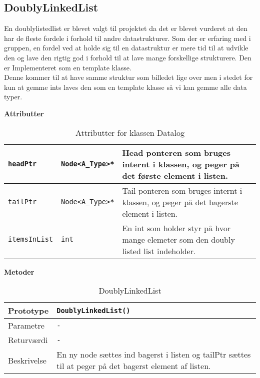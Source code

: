 \subsection{DoublyLinkedList}

En doublylistedlist er blevet valgt til projektet da det er blevet vurderet at den har de fleste fordele i forhold til andre datastrukturer. Som der er erfaring med i gruppen, en fordel ved at holde sig til en datastruktur er mere tid til at udvikle den og lave den rigtig god i forhold til at lave mange forskellige strukturere. Den er Implementeret som en template klasse.\\


Denne kommer til at have samme struktur som billedet lige over men i stedet for kun at gemme ints laves den som en template klasse så vi kan gemme alle data typer.

\textbf{Attributter}

\begin{table}[h]
\begin{tabularx}{\textwidth}{| >{\raggedright\arraybackslash}X | >{\raggedright\arraybackslash}X | >{\raggedright\arraybackslash}p{10 cm} |} \hline
\texttt{headPtr} & \texttt{Node<A\_Type>*} & Head ponteren som bruges internt i klassen, og peger på det første element i listen. \\\hline
\texttt{tailPtr} & \texttt{Node<A\_Type>*} & Tail ponteren som bruges internt i klassen, og peger på det bagerste element i listen. \\\hline
\texttt{itemsInList} & \texttt{int} & En int som holder styr på hvor mange elemeter som den doubly listed list indeholder. \\\hline
\end{tabularx}
\caption{Attributter for klassen Datalog}
\label{table:Datalog_attributter}
\end{table}

\textbf{Metoder}

\begin{table}[h]
\begin{tabularx}{\textwidth}{| >{\raggedright\arraybackslash}p{2.5 cm} | >{\raggedright\arraybackslash}X |} \hline
Prototype & \texttt{DoublyLinkedList()} \\\hline
Parametre & \texttt{-}\\\hline
Returværdi & \texttt{-}\\\hline
Beskrivelse & En ny node sættes ind bagerst i listen og tailPtr sættes til at peger på det bagerst element af listen. \\\hline
\end{tabularx}
\caption{DoublyLinkedList}
\label{table:DoublyLinkedList_contructor}
\end{table}


